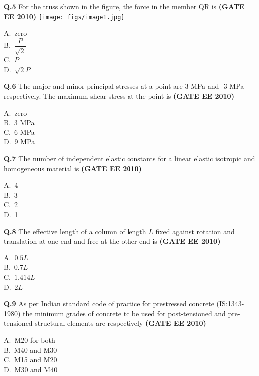 \documentclass[journal,12pt,onecolumn]{exam}
\theoremstyle{remark}
\begin{document}
\noindent\textbf{Q.5} For the truss shown in the figure, the force in the member QR is \hfill\textbf{(GATE EE 2010)}
\centering
\texttt{[image: figs/image1.jpg]}
\begin{multicols}{4}
A.\ zero \\
B.\ $\dfrac{P}{\sqrt{2}}$ \\
C.\ $P$ \\
D.\ $\sqrt{2}P$
\end{multicols}

\noindent\textbf{Q.6} The major and minor principal stresses at a point are 3 MPa and -3 MPa respectively. The maximum shear stress at the point is \hfill\textbf{(GATE EE 2010)}
\begin{multicols}{4}
A.\ zero \\
B.\ 3 MPa \\
C.\ 6 MPa \\
D.\ 9 MPa
\end{multicols}

\noindent\textbf{Q.7} The number of independent elastic constants for a linear elastic isotropic and homogeneous material is \hfill\textbf{(GATE EE 2010)}
\begin{multicols}{4}
A.\ 4 \\
B.\ 3 \\
C.\ 2 \\
D.\ 1
\end{multicols}

\noindent\textbf{Q.8} The effective length of a column of length $L$ fixed against rotation and translation at one end and free at the other end is \hfill\textbf{(GATE EE 2010)}
\begin{multicols}{4}
A.\ $0.5L$ \\
B.\ $0.7L$ \\
C.\ $1.414L$ \\
D.\ $2L$
\end{multicols}

\setlength{\parindent}{0pt}
\setlength{\parskip}{0.5cm}


\noindent\textbf{Q.9} As per Indian standard code of practice for prestressed concrete (IS:1343-1980) the minimum grades of concrete to be used for post-tensioned and pre-tensioned structural elements are respectively 
\hfill\textbf{(GATE EE 2010)}
\begin{multicols}{4}
A.\ M20 for both \\
B.\ M40 and M30 \\
C.\ M15 and M20 \\
D.\ M30 and M40
\end{multicols}
\end{document}

